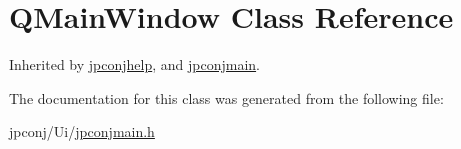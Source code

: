 \hypertarget{class_q_main_window}{}\section{Q\+Main\+Window Class Reference}
\label{class_q_main_window}


Inherited by \hyperlink{classjpconjhelp}{jpconjhelp}, and \hyperlink{classjpconjmain}{jpconjmain}.



The documentation for this class was generated from the following file\+:\begin{DoxyCompactItemize}
\item 
jpconj/\+Ui/\hyperlink{jpconjmain_8h}{jpconjmain.\+h}\end{DoxyCompactItemize}

